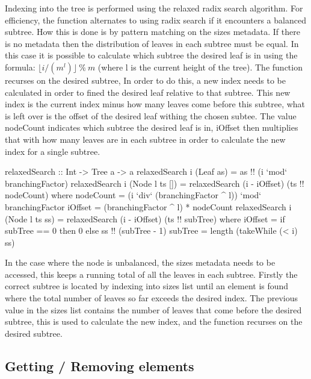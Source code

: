 \documentclass[11pt,a4paper,oneside]{article}
\begin{document}
Indexing into the tree is performed using the relaxed radix search algorithm. For efficiency, the function alternates to using radix search if it encounters a balanced subtree. How this is done is by pattern matching on the sizes metadata. If there is no metadata then the distribution of leaves in each subtree must be equal. In this case it is possible to calculate which subtree the desired leaf is in using the formula: $\lfloor i / (m^l) \rfloor\  \%\  m$ (where l is the current height of the tree). The function recurses on the desired subtree, In order to do this, a new index needs to be calculated in order to fined the desired leaf relative to that subtree. This new index is the current index minus how many leaves come before this subtree, what is left over is the offset of the desired leaf withing the chosen subtee. The value nodeCount indicates which subtree the desired leaf is in, iOffset then multiplies that with how many leaves are in each subtree in order to calculate the new index for a single subtree.

\begin{haskell}

relaxedSearch :: Int -> Tree a -> a 
relaxedSearch i (Leaf as) = as !! (i `mod` branchingFactor)
relaxedSearch i (Node l ts [])  = relaxedSearch (i - iOffset) (ts !! nodeCount) 
                where nodeCount = (i `div` (branchingFactor ^ l)) `mod` branchingFactor
                      iOffset   = (branchingFactor ^ l) * nodeCount
relaxedSearch i (Node l ts ss)  = relaxedSearch (i - iOffset) (ts !! subTree)
                where iOffset   = if subTree == 0 then 0 else ss !! (subTree - 1) 
                      subTree   = length (takeWhile (< i) ss) 

\end{haskell}

In the case where the node is unbalanced, the sizes metadata needs to be accessed, this keeps a running total of all the leaves in each subtree. Firstly the correct subtree is located by indexing into sizes list until an element is found where the total number of leaves so far exceeds the desired index. The previous value in the sizes list contains the number of leaves that come before the desired subtree, this is used to calculate the new index, and the function recurses on the desired subtree.

\subsection{Getting / Removing elements}
\end{document}
